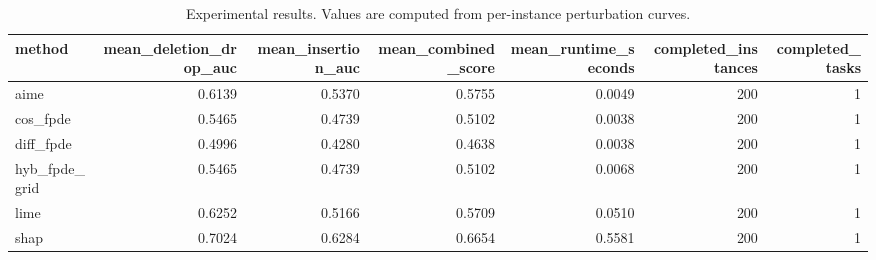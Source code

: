 \begin{table}[t]
\caption{Experimental results. Values are computed from per-instance perturbation curves.}
\label{tab:main_results_computed}
\centering
\begin{tabular}{lrrrrrr}
\toprule
method & mean\_deletion\_drop\_auc & mean\_insertion\_auc & mean\_combined\_score & mean\_runtime\_seconds & completed\_instances & completed\_tasks \\
\midrule
aime & 0.6139 & 0.5370 & 0.5755 & 0.0049 & 200 & 1 \\
cos\_fpde & 0.5465 & 0.4739 & 0.5102 & 0.0038 & 200 & 1 \\
diff\_fpde & 0.4996 & 0.4280 & 0.4638 & 0.0038 & 200 & 1 \\
hyb\_fpde\_grid & 0.5465 & 0.4739 & 0.5102 & 0.0068 & 200 & 1 \\
lime & 0.6252 & 0.5166 & 0.5709 & 0.0510 & 200 & 1 \\
shap & 0.7024 & 0.6284 & 0.6654 & 0.5581 & 200 & 1 \\
\bottomrule
\end{tabular}

\end{table}
